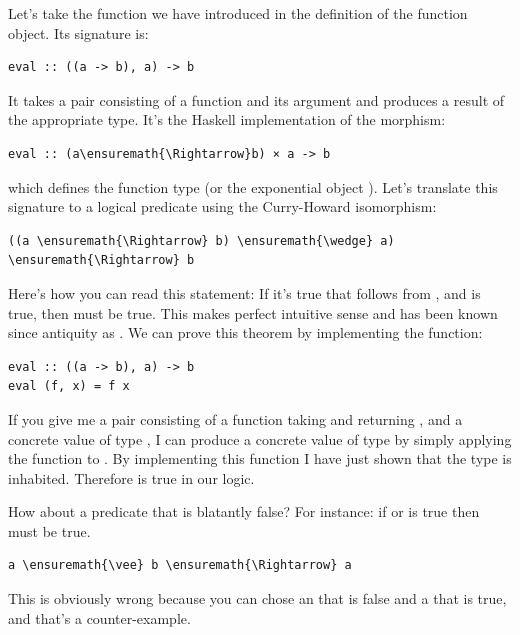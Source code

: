 Let's take the function  we have introduced in the
definition of the function object. Its signature is:

\begin{verbatim}
eval :: ((a -> b), a) -> b
\end{verbatim}
It takes a pair consisting of a function and its argument and produces a
result of the appropriate type. It's the Haskell implementation of the
morphism:

\begin{Verbatim}[commandchars=\\\{\}]
eval :: (a\ensuremath{\Rightarrow}b) × a -> b
\end{Verbatim}
which defines the function type  (or the exponential object
). Let's translate this signature to a logical predicate
using the Curry-Howard isomorphism:

\begin{Verbatim}[commandchars=\\\{\}]
((a \ensuremath{\Rightarrow} b) \ensuremath{\wedge} a) \ensuremath{\Rightarrow} b
\end{Verbatim}
Here's how you can read this statement: If it's true that 
follows from , and  is true, then  must be
true. This makes perfect intuitive sense and has been known since
antiquity as . We can prove this theorem by
implementing the function:

\begin{verbatim}
eval :: ((a -> b), a) -> b
eval (f, x) = f x
\end{verbatim}
If you give me a pair consisting of a function  taking
 and returning , and a concrete value  of
type , I can produce a concrete value of type  by
simply applying the function  to . By implementing
this function I have just shown that the type
 is inhabited.
Therefore  is true in our logic.

How about a predicate that is blatantly false? For instance: if
 or  is true then  must be true.

\begin{Verbatim}[commandchars=\\\{\}]
a \ensuremath{\vee} b \ensuremath{\Rightarrow} a
\end{Verbatim}
This is obviously wrong because you can chose an  that is
false and a  that is true, and that's a counter-example.

